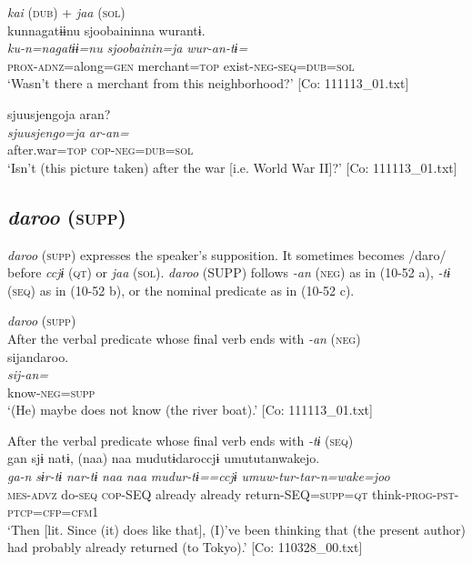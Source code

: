 \ea\label{ex:10.51}   \textit{kai} (\textsc{dub}) + \textit{jaa} (\textsc{sol})\\
  \ea  %
      \glll    kunnagatɨɨnu  {\textbar}sjoobainin{\textbar}na  wurantɨ.\\
      \textit{ku-n=nagatɨɨ=nu}  \textit{sjoobainin=ja}  \textit{wur-an-tɨ=}\\
      \textsc{prox}-\textsc{adnz}=along=\textsc{gen}  merchant=\textsc{top}  exist-\textsc{neg}-\textsc{seq}=\textsc{dub}=\textsc{sol}\\
      \glt       ‘Wasn’t there a merchant from this neighborhood?’ [Co: 111113\_01.txt]

  \ex %
      \glll    {\textbar}sjuusjengo{\textbar}ja  aran?\\
      \textit{sjuusjengo=ja}  \textit{ar-an=}\\
      after.war=\textsc{top}  \textsc{cop}-\textsc{neg}=\textsc{dub}=\textsc{sol}\\
      \glt       ‘Isn’t (this picture taken) after the war [i.e. World War II]?’ [Co: 111113\_01.txt]
    \z
\z

\subsection{\textit{daroo} (\textsc{supp})}\label{sec:10.3.7}

\textit{daroo} (\textsc{supp}) expresses the speaker’s supposition. It sometimes becomes /daro/ before \textit{ccjɨ} (\textsc{qt}) or \textit{jaa} (\textsc{sol}). \textit{daroo} (SUPP) follows \textit{{}-an} (\textsc{neg}) as in (10-52 a), \textit{{}-tɨ} (\textsc{seq}) as in (10-52 b), or the nominal predicate as in (10-52 c).

\ea\label{ex:10.52}   \textit{daroo} (\textsc{supp})\\
  \ea After the verbal predicate whose final verb ends with \textit{{}-an} (\textsc{neg})\\
      \glll    sijandaroo.\\
    \textit{sij-an=}\\
    know-\textsc{neg}=\textsc{supp}\\
\glt     ‘(He) maybe does not know (the river boat).’  [Co: 111113\_01.txt]

  \ex After the verbal predicate whose final verb ends with \textit{{}-tɨ} (\textsc{seq})\\
      \glll    gan  sjɨ  natɨ,  (naa)  naa  mudutɨdaroccjɨ   umututanwakejo.\\
    \textit{ga-n}  \textit{sɨr-tɨ}  \textit{nar-tɨ}  \textit{naa}  \textit{naa}  \textit{mudur-tɨ==ccjɨ}   \textit{umuw-tur-tar-n=wake=joo}\\
    \textsc{mes}-\textsc{advz}  do-\textsc{seq}  \textsc{cop}-SEQ  already  already  return-SEQ=\textsc{supp}=\textsc{qt}  think-\textsc{prog}-\textsc{pst}-\textsc{ptcp}=\textsc{cfp}=\textsc{cfm}1\\
\glt     ‘Then [lit. Since (it) does like that], (I)’ve been thinking that (the present author) had probably already returned (to Tokyo).’  [Co: 110328\_00.txt]

